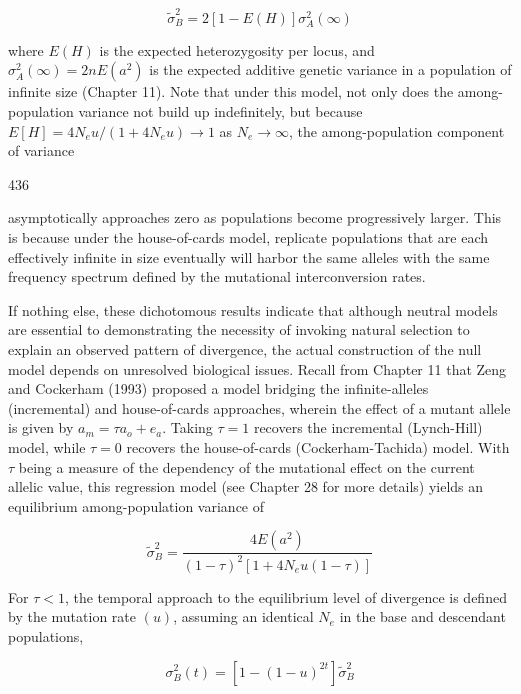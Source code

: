 \documentclass{article}
\begin{document}
\begin{equation}
\widetilde{\sigma}_{B}^{2}=2[1-E(H)]\sigma_{A}^{2}(\infty)
\tag{12.11}
\label{eq:12_11}
\end{equation}

where $E(H)$ is the expected heterozygosity per locus, and $\sigma_A^2(\infty) = 2nE(a^2)$ is the expected additive genetic variance in a population of infinite size (Chapter 11). Note that under this model, not only does the among-population variance not build up indefinitely, but because $E[H] = 4N_e u/(1 + 4N_e u) \to 1$ as $N_e \to \infty$, the among-population component of variance

436

asymptotically approaches zero as populations become progressively larger. This is because under the house-of-cards model, replicate populations that are each effectively infinite in size eventually will harbor the same alleles with the same frequency spectrum defined by the mutational interconversion rates.

If nothing else, these dichotomous results indicate that although neutral models are essential to demonstrating the necessity of invoking natural selection to explain an observed pattern of divergence, the actual construction of the null model depends on unresolved biological issues. Recall from Chapter 11 that Zeng and Cockerham (1993) proposed a model bridging the infinite-alleles (incremental) and house-of-cards approaches, wherein the effect of a mutant allele is given by  $ a_m = \tau a_o + e_a $. Taking  $ \tau = 1 $ recovers the incremental (Lynch-Hill) model, while  $ \tau = 0 $ recovers the house-of-cards (Cockerham-Tachida) model. With  $ \tau $ being a measure of the dependency of the mutational effect on the current allelic value, this regression model (see Chapter 28 for more details) yields an equilibrium among-population variance of

\begin{equation}
\widetilde{\sigma}_{B}^{2}=\frac{4E(a^{2})}{(1-\tau)^{2}[1+4N_{e}u(1-\tau)]}
\tag{12.12}
\label{eq:12_12}
\end{equation}

For  $ \tau < 1 $, the temporal approach to the equilibrium level of divergence is defined by the mutation rate  $ (u) $, assuming an identical  $ N_e $ in the base and descendant populations,

\begin{equation}
\sigma_{B}^{2}(t)=\left[1-(1-u)^{2t}\right]\widetilde{\sigma}_{B}^{2}
\tag{12.13}
\label{eq:12_13}
\end{equation}
\end{document}
